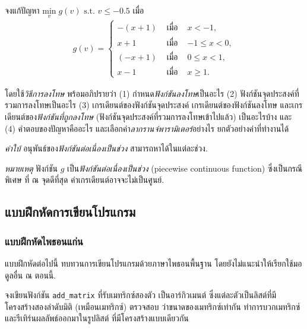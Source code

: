 \begin{Exercise}
	\label{ex: opt min problem piecewise}
	จงแก้ปัญหา
	$\underset{v}{\mathrm{min}} \; g(v)
	\mbox{ s.t. } v \leq -0.5$
	เมื่อ 
	\begin{eqnarray}
	g(v) = \left\{ 
	\begin{array}{lcl}
	-(x + 1) & \mbox{ เมื่อ } & x < -1, \\
	x + 1 & \mbox{ เมื่อ } & -1 \leq x < 0, \\
	(-x + 1) & \mbox{ เมื่อ } & 0 \leq x < 1, \\
	x - 1 & \mbox{ เมื่อ } & x \geq 1.
	\end{array}
	\right.
	\label{eq: ex opt const piecewise f}
	\end{eqnarray}
	
	
	โดยใช้\textit{วิธีการลงโทษ} 
	พร้อมอภิปรายว่า
	(1) กำหนด\textit{ฟังก์ชันลงโทษ}เป็นอะไร
	(2) ฟังก์ชันจุดประสงค์ที่รวมการลงโทษเป็นอะไร
	(3) เกรเดียนต์ของฟังก์ชันจุดประสงค์
	เกรเดียนต์ของฟังก์ชันลงโทษ
	และเกรเดียนต์ของ\textit{ฟังก์ชันที่ถูกลงโทษ} (ฟังก์ชันจุดประสงค์ที่รวมการลงโทษเข้าไปแล้ว)
	เป็นอะไรบ้าง
	และ
	(4) คำตอบของปัญหาคืออะไร
	และเลือกค่า\textit{ลากรานจ์พารามิเตอร์}อย่างไร ยกตัวอย่างค่าที่ทำงานได้
	
	\textit{คำใบ้}
	อนุพันธ์ของ\textit{ฟังก์ชันต่อเนื่องเป็นช่วง}
	สามารถหาได้ในแต่ละช่วง.
	
	\textit{หมายเหตุ}
	ฟังก์ชัน $g$ เป็น\textit{ฟังก์ชันต่อเนื่องเป็นช่วง} (piecewise continuous function)
	ซึ่งเป็นกรณีพิเศษ ที่ ณ จุดดีที่สุด 
	ค่าเกรเดียนต์อาจจะไม่เป็นศูนย์.
	
	
\end{Exercise}

\subsection{แบบฝึกหัดการเขียนโปรแกรม}


\subsubsection{แบบฝึกหัดไพธอนแก่น}
แบบฝึกหัดต่อไปนี้
ทบทวนการเขียนโปรแกรมด้วยภาษาไพธอนพื้นฐาน
โดยยังไม่แนะนำให้เรียกใช้มอดูลอื่น ณ ตอนนี้.

\begin{Exercise}
	\label{ex: linalg addition python}
	
	จงเขียนฟังก์ชัน \verb|add_matrix| ที่รับเมทริกซ์สองตัว 
	เป็นอาร์กิวเมนต์ ซึ่งแต่ละตัวเป็นลิสต์ที่มีโครงสร้างสองลำดับมิติ (เหมือนเมทริกซ์)
	ตรวจสอบ
	ว่าขนาดของเมทริกซ์เท่ากัน
	ทำการบวกเมทริกซ์
	และรีเทิร์นผลลัพธ์ออกมาในรูปลิสต์
	ที่มีโครงสร้างแบบเดียวกัน
	
\end{Exercise}

